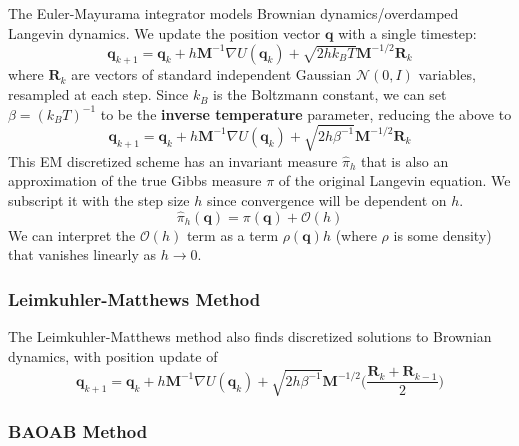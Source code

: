 \documentclass{article}
\begin{document}
      The Euler-Mayurama integrator models Brownian dynamics/overdamped Langevin dynamics. We update the position vector $\mathbf{q}$ with a single timestep: 
      \begin{equation}
        \mathbf{q}_{k+1} = \mathbf{q}_k + h \mathbf{M}^{-1} \nabla U(\mathbf{q}_k) + \sqrt{2 h k_B T} \mathbf{M}^{-1/2} \mathbf{R}_k
      \end{equation}
      where $\mathbf{R}_k$ are vectors of standard independent Gaussian $\mathcal{N}(0, I)$ variables, resampled at each step. Since $k_B$ is the Boltzmann constant, we can set $\beta = (k_B T)^{-1}$ to be the \textbf{inverse temperature} parameter, reducing the above to 
      \begin{equation}
        \mathbf{q}_{k+1} = \mathbf{q}_k + h \mathbf{M}^{-1} \nabla U(\mathbf{q}_k) + \sqrt{2 h \beta^{-1}} \mathbf{M}^{-1/2} \mathbf{R}_k
      \end{equation}
      This EM discretized scheme has an invariant measure $\hat{\pi}_h$ that is also an approximation of the true Gibbs measure $\pi$ of the original Langevin equation. We subscript it with the step size $h$ since convergence will be dependent on $h$. 
      \begin{equation}
        \hat{\pi}_h (\mathbf{q}) = \pi(\mathbf{q}) + \mathcal{O}(h)
      \end{equation}
      We can interpret the $\mathcal{O}(h)$ term as a term $\rho(\mathbf{q}) h$ (where $\rho$ is some density) that vanishes linearly as $h \rightarrow 0$. 

    \subsubsection{Leimkuhler-Matthews Method}

      The Leimkuhler-Matthews method also finds discretized solutions to Brownian dynamics, with position update of 
      \begin{equation}
        \mathbf{q}_{k+1} = \mathbf{q}_k + h \mathbf{M}^{-1} \nabla U(\mathbf{q}_k) + \sqrt{2 h \beta^{-1}} \mathbf{M}^{-1/2} \bigg( \frac{\mathbf{R}_k + \mathbf{R}_{k-1}}{2} \bigg)
      \end{equation}

    \subsubsection{BAOAB Method}
\end{document}
